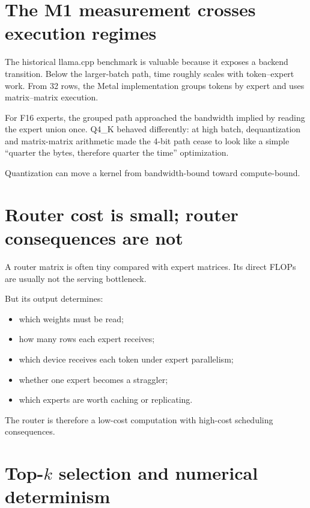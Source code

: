\section{The M1 measurement crosses execution regimes}

The historical llama.cpp benchmark is valuable because it exposes a backend transition.
Below the larger-batch path, time roughly scales with token--expert work. From 32 rows,
the Metal implementation groups tokens by expert and uses matrix--matrix execution.

For F16 experts, the grouped path approached the bandwidth implied by reading the
expert union once. Q4\_K behaved differently: at high batch, dequantization and
matrix-matrix arithmetic made the 4-bit path cease to look like a simple
``quarter the bytes, therefore quarter the time'' optimization.

Quantization can move a kernel from bandwidth-bound toward compute-bound.


\section{Router cost is small; router consequences are not}

A router matrix is often tiny compared with expert matrices. Its direct FLOPs are
usually not the serving bottleneck.

But its output determines:
\begin{itemize}
\item which weights must be read;
\item how many rows each expert receives;
\item which device receives each token under expert parallelism;
\item whether one expert becomes a straggler;
\item which experts are worth caching or replicating.
\end{itemize}

The router is therefore a low-cost computation with high-cost scheduling consequences.

\section{Top-$k$ selection and numerical determinism}

